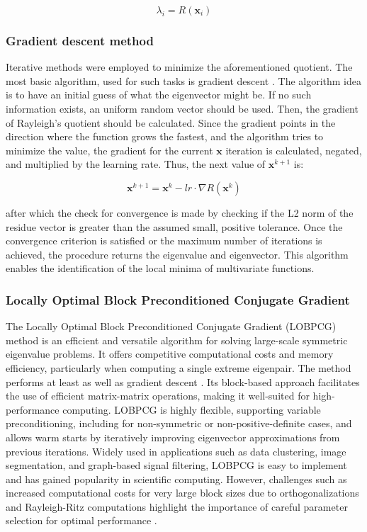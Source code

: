 \begin{equation}
	\lambda_i = R(\textbf{x}_i)
\end{equation}

\noindent

\subsubsection{Gradient descent method}
Iterative methods were employed to minimize the aforementioned quotient. The most basic algorithm, used for such tasks is gradient descent \cite{gradient_descent}. The algorithm idea is to have an initial guess of what the eigenvector might be. If no such information exists, an uniform random vector should be used. Then, the gradient of Rayleigh's quotient should be calculated. Since the gradient points in the direction where the function grows the fastest, and the algorithm tries to minimize the value, the gradient for the current $\textbf{x}$ iteration is calculated, negated, and multiplied by the learning rate. Thus, the next value of $\textbf{x}^{k+1}$ is:

\begin{equation}
	\textbf{x}^{k+1} = \textbf{x}^{k} - lr \cdot \nabla R(\textbf{x}^{k})
\end{equation}

\noindent after which the check for convergence is made by checking if the L2 norm of the residue vector is greater than the assumed small, positive tolerance. Once the convergence criterion is satisfied or the maximum number of iterations is achieved, the procedure returns the eigenvalue and eigenvector. This algorithm enables the identification of the local minima of multivariate functions.

\subsubsection{Locally Optimal Block Preconditioned Conjugate Gradient}

The Locally Optimal Block Preconditioned Conjugate Gradient (LOBPCG) method is an efficient and versatile algorithm for solving large-scale symmetric eigenvalue problems. It offers competitive computational costs and memory efficiency, particularly when computing a single extreme eigenpair. The method performs at least as well as gradient descent \cite{knyazew2001}. Its block-based approach facilitates the use of efficient matrix-matrix operations, making it well-suited for high-performance computing. LOBPCG is highly flexible, supporting variable preconditioning, including for non-symmetric or non-positive-definite cases, and allows warm starts by iteratively improving eigenvector approximations from previous iterations. Widely used in applications such as data clustering, image segmentation, and graph-based signal filtering, LOBPCG is easy to implement and has gained popularity in scientific computing. However, challenges such as increased computational costs for very large block sizes due to orthogonalizations and Rayleigh-Ritz computations highlight the importance of careful parameter selection for optimal performance \cite{knyazew2017}.

